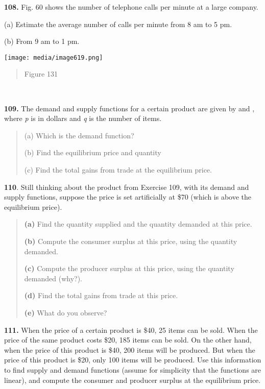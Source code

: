 \textbf{108.} Fig. 60 shows the number of telephone calls per minute at
a large company.

(a) Estimate the average number of calls per minute from 8 am to 5 pm.

(b) From 9 am to 1 pm.

\texttt{[image: media/image619.png]}

\begin{quote}
Figure 131
\end{quote}

\textbf{\\
}

\textbf{109.} The demand and supply functions for a certain product are
given by and , where \emph{p} is in dollars and \emph{q} is the number
of items.

\begin{quote}
(a) Which is the demand function?

(b) Find the equilibrium price and quantity

(c) Find the total gains from trade at the equilibrium price.
\end{quote}

\textbf{110}. Still thinking about the product from Exercise 109, with
its demand and supply functions, suppose the price is set artificially
at \$70 (which is above the equilibrium price).

\begin{quote}
\textbf{(a)} Find the quantity supplied and the quantity demanded at
this price.

\textbf{(b)} Compute the consumer surplus at this price, using the
quantity demanded.

\textbf{(c)} Compute the producer surplus at this price, using the
quantity demanded (why?).

\textbf{(d)} Find the total gains from trade at this price.

\textbf{(e)} What do you observe?
\end{quote}

\textbf{111.} When the price of a certain product is \$40, 25 items can
be sold. When the price of the same product costs \$20, 185 items can be
sold. On the other hand, when the price of this product is \$40, 200
items will be produced. But when the price of this product is \$20, only
100 items will be produced. Use this information to find supply and
demand functions (assume for simplicity that the functions are linear),
and compute the consumer and producer surplus at the equilibrium price.

